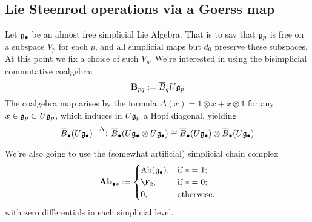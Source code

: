\documentclass[10pt]{article}
\begin{document}
\begin{Lie Steenrods satisfy the Adem relation}

\section{Lie Steenrod operations via a Goerss map}
Let $\mathfrak{g}_\bullet$ be an almost free simplicial Lie Algebra. That is to say that $\mathfrak{g}_p$ is free on a subspace $V_p$ for each $p$, and all simplicial maps but $d_0$ preserve these subspaces. At this point we fix a choice of such $V_p$.
We're interested in using the bisimplicial commutative coalgebra:
\[\textbf{B}_{pq}:=\overline{B}_q U\mathfrak{g}_p\]
The coalgebra map arises by the formula $\Delta(x)=1\otimes x+x\otimes 1$ for any $x\in\mathfrak{g}_p\subset U\mathfrak{g}_p$, which induces in $U\mathfrak{g}_p$ a Hopf diagonal, yielding
\[\overline{B}_\bullet (U\mathfrak{g}_\bullet)\overset{\Delta}{\longrightarrow}\overline{B}_\bullet (U\mathfrak{g}_\bullet\otimes U\mathfrak{g}_\bullet)\cong\overline{B}_\bullet (U\mathfrak{g}_\bullet)\otimes \overline{B}_\bullet (U\mathfrak{g}_\bullet)\]


We're also going to use the (somewhat artificial) simplicial chain complex
\[\textbf{Ab}_{\bullet *}:=\begin{cases}
\textup{Ab}(\frakg_\bullet),&\textup{if }*=1;\\
\F_2,&\textup{if }*=0;
\\0,&\textup{otherwise.}
\end{cases}
\]
with zero differentials in each simplicial level.


\end{Lie Steenrods satisfy the Adem relation}
\end{document}
